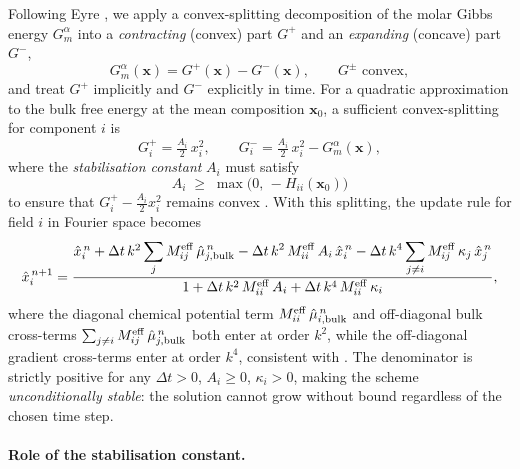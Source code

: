 {Following Eyre \cite{eyre1998unconditionally}, we apply a convex-splitting decomposition of the molar Gibbs energy $G^\alpha_m$ into a \emph{contracting} (convex) part $G^+$ and an \emph{expanding} (concave) part $G^-$,
%
\begin{equation}\label{eq:eyre_split}
    G^\alpha_m(\boldsymbol{x}) = G^+(\boldsymbol{x}) - G^-(\boldsymbol{x}),
    \qquad G^{\pm} \text{ convex},
\end{equation}
%
and treat $G^+$ implicitly and $G^-$ explicitly in time.  For a quadratic approximation to the bulk free energy at the mean composition $\boldsymbol{x}_0$, a sufficient convex-splitting for component $i$ is
%
\begin{equation}\label{eq:eyre_Adef}
    G^+_i = \tfrac{A_i}{2}\,x_i^2,
    \qquad
    G^-_i = \tfrac{A_i}{2}\,x_i^2 - G^\alpha_m(\boldsymbol{x}),
\end{equation}
%
where the \emph{stabilisation constant} $A_i$ must satisfy
%
\begin{equation}\label{eq:eyre_condition}
    A_i \;\geq\; \max\bigl(0,\,-H_{ii}(\boldsymbol{x}_0)\bigr)
\end{equation}
%
to ensure that $G^+_i - \tfrac{A_i}{2}x_i^2$ remains convex \cite{eyre1998unconditionally,shen2010numerical}.  With this splitting, the update rule for field $i$ in Fourier space becomes
%
\begin{equation}\label{eq:eyre_update}
    \hat{x}_i^{\,n+1}
    = \frac{
        \hat{x}_i^{\,n}
        + \Delta t\,k^2 \displaystyle\sum_j M^{\rm eff}_{ij}\,\hat{\mu}_{j,\rm bulk}^{\,n}
        - \Delta t\,k^2\,M^{\rm eff}_{ii}\,A_i\,\hat{x}_i^{\,n}
        - \Delta t\,k^4 \displaystyle\sum_{j \neq i} M^{\rm eff}_{ij}\,\kappa_j\,\hat{x}_j^{\,n}
      }{
        1 + \Delta t\,k^2\,M^{\rm eff}_{ii}\,A_i
        + \Delta t\,k^4\,M^{\rm eff}_{ii}\,\kappa_i
      },
\end{equation}
%
where the diagonal chemical potential term $M^{\rm eff}_{ii}\,\hat{\mu}_{i,\rm bulk}^{\,n}$ and off-diagonal bulk cross-terms $\sum_{j\neq i}M^{\rm eff}_{ij}\,\hat{\mu}_{j,\rm bulk}^{\,n}$ both enter at order $k^2$, while the off-diagonal gradient cross-terms enter at order $k^4$, consistent with . The denominator is strictly positive for any $\Delta t > 0$, $A_i \geq 0$, $\kappa_i > 0$, making the scheme \emph{unconditionally stable}: the solution cannot grow without bound regardless of the chosen time step.

\paragraph{Role of the stabilisation constant.}

}
